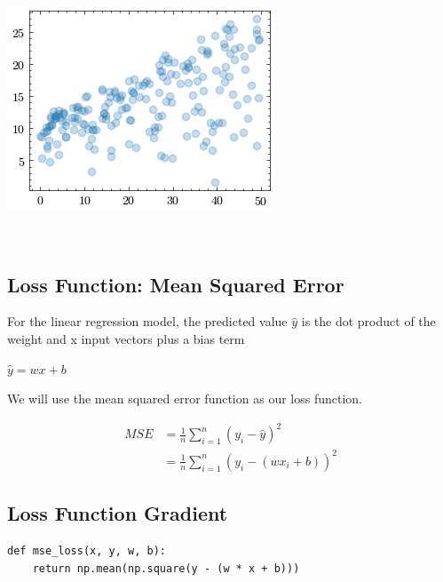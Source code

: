 \documentclass[openany]{book}
\begin{document}
    \begin{center}
    \includegraphics[width=\textwidth]{combined_files/combined_5_1.png}
    \end{center}
    { \hspace*{\fill} \\}
    
    \subsection{Loss Function: Mean Squared
Error}\label{loss-function-mean-squared-error}

    For the linear regression model, the predicted value \(\hat{y}\) is the
dot product of the weight and x input vectors plus a bias term

\(\hat{y} = w x + b\)

We will use the mean squared error function as our loss function.

\begin{align*}
MSE &= \frac{1}{n} \sum_{i=1}^{n}(y_{i}-\hat{y})^2 \\
&= \frac{1}{n} \sum_{i=1}^{n}(y_{i}-(w x_{i} + b))^2
\end{align*}

    \subsection{Loss Function Gradient}\label{loss-function-gradient}

    \begin{tcolorbox}
\tiny
\begin{verbatim}
def mse_loss(x, y, w, b):
    return np.mean(np.square(y - (w * x + b)))
\end{verbatim}
\end{tcolorbox}
\end{document}
